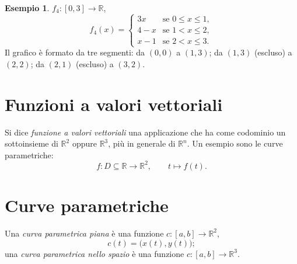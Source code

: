 \documentclass[11pt,a4paper]{article}
\theoremstyle{definition}
\newtheorem*{esempio}{Esempio}
\begin{document}
\begin{esempio}
$f_4 : [0, 3] \to \mathbb{R}$,
\[
f_4(x) = \begin{cases}
3x & \text{se } 0 \leq x \leq 1, \\
4 - x & \text{se } 1 < x \leq 2, \\
x - 1 & \text{se } 2 < x \leq 3.
\end{cases}
\]
Il grafico è formato da tre segmenti: da $(0, 0)$ a $(1, 3)$; da $(1, 3)$ (escluso) a $(2, 2)$; da $(2, 1)$ (escluso) a $(3, 2)$.
\end{esempio}

\begin{center}
\end{center}

\section{Funzioni a valori vettoriali}

\begin{definizione}
Si dice \emph{funzione a valori vettoriali} una applicazione che ha come codominio un sottoinsieme di $\mathbb{R}^2$ oppure $\mathbb{R}^3$, più in generale di $\mathbb{R}^n$. Un esempio sono le curve parametriche:
\[
f : D \subseteq \mathbb{R} \to \mathbb{R}^2, \qquad t \mapsto f(t).
\]
\end{definizione}

\section{Curve parametriche}

\begin{definizione}
Una \emph{curva parametrica piana} è una funzione $c : [a, b] \to \mathbb{R}^2$,
\[
c(t) = \big(x(t), y(t)\big);
\]
una \emph{curva parametrica nello spazio} è una funzione $c : [a, b] \to \mathbb{R}^3$.
\end{definizione}
\end{document}
